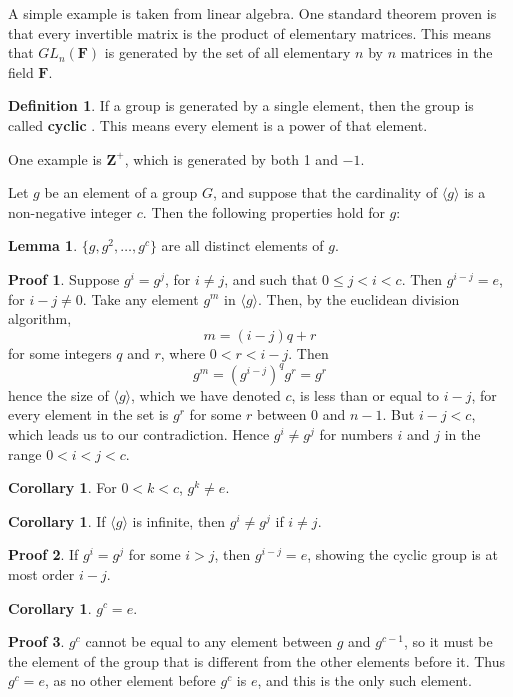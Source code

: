 \documentclass[12pt]{amsbook}
\theoremstyle{definition}
\newtheorem{lemma}[theorem]{Lemma}
\newtheorem{corollary}[theorem]{Corollary}
\newtheorem{definition}{Definition}
\newtheorem*{prf}{Proof}
\newcommand{\bint}{\mathbf{Z}} %
\newcommand{\gen}[1]{\langle #1 \rangle} %
\begin{document}
A simple example is taken from linear algebra. One standard theorem proven is that every invertible matrix is the product of elementary matrices. This means that $GL_n(\mathbf{F})$ is generated by the set of all elementary $n$ by $n$ matrices in the field $\mathbf{F}$.

\begin{definition}
    If a group is generated by a single element, then the group is called {\bf cyclic} . This means every element is a power of that element.
\end{definition}

One example is $\bint^+$, which is generated by both 1 and $-1$.

Let $g$ be an element of a group $G$, and suppose that the cardinality of $\gen{g}$ is a non-negative integer $c$. Then the following properties hold for $g$:

\begin{lemma} $\{ g, g^2, \dots, g^c \}$ are all distinct elements of $g$. \end{lemma}
\begin{prf}
    Suppose $g^i = g^j$, for $i \neq j$, and such that $0 \leq j < i < c$. Then $g^{i - j} = e$, for $i - j \neq 0$. Take any element $g^m$ in $\gen{g}$. Then, by the euclidean division algorithm,
    \[ m = (i - j)q + r \]
    for some integers $q$ and $r$, where $0 < r < i - j$. Then
    \[ g^m = (g^{i - j})^q g^r = g^r \]
    hence the size of $\gen{g}$, which we have denoted $c$, is less than or equal to $i - j$, for every element in the set is $g^r$ for some $r$ between 0 and $n-1$. But $i - j < c$, which leads us to our contradiction. Hence $g^i \neq g^j$ for numbers $i$ and $j$ in the range $0 < i < j < c$.
\end{prf}

\begin{corollary} For $0 < k < c$, $g^k \neq e$. \end{corollary}

\begin{corollary} If $\gen{g}$ is infinite, then $g^i \neq g^j$ if $i \neq j$. \end{corollary}
\begin{prf}
    If $g^i = g^j$ for some $i > j$, then $g^{i-j} = e$, showing the cyclic group is at most order $i - j$.
\end{prf}

\begin{corollary} $g^c = e$. \end{corollary}
\begin{prf} $g^c$ cannot be equal to any element between $g$ and $g^{c-1}$, so it must be the element of the group that is different from the other elements before it. Thus $g^c = e$, as no other element before $g^c$ is $e$, and this is the only such element. \end{prf}
\end{document}
